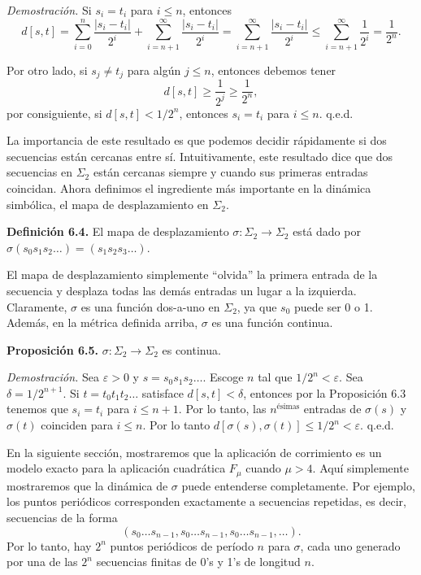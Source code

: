 \documentclass[10pt,a4paper]{book}
\begin{document}
\textit{Demostración.} Si $s_i = t_i$ para $i \leq n$, entonces
\[
d[s,t] = \sum_{i=0}^n \frac{|s_i - t_i|}{2^i} + \sum_{i=n+1}^\infty \frac{|s_i - t_i|}{2^i}
= \sum_{i=n+1}^\infty \frac{|s_i - t_i|}{2^i} \leq \sum_{i=n+1}^\infty \frac{1}{2^i} = \frac{1}{2^n}.
\]

Por otro lado, si $s_j \ne t_j$ para algún $j \leq n$, entonces debemos tener
\[
d[s,t] \geq \frac{1}{2^j} \geq \frac{1}{2^n},
\]
por consiguiente, si $d[s,t] < 1/2^n$, entonces $s_i = t_i$ para $i \leq n$. \hfill q.e.d.

La importancia de este resultado es que podemos decidir rápidamente si dos secuencias están cercanas entre sí. Intuitivamente, este resultado dice que dos secuencias en $\Sigma_2$ están cercanas siempre y cuando sus primeras entradas coincidan. Ahora definimos el ingrediente más importante en la dinámica simbólica, el mapa de desplazamiento en $\Sigma_2$.

\textbf{Definición 6.4.} El mapa de desplazamiento $\sigma : \Sigma_2 \to \Sigma_2$ está dado por $\sigma(s_0 s_1 s_2 \ldots) = (s_1 s_2 s_3 \ldots)$.

El mapa de desplazamiento simplemente “olvida” la primera entrada de la secuencia y desplaza todas las demás entradas un lugar a la izquierda. Claramente, $\sigma$ es una función dos-a-uno en $\Sigma_2$, ya que $s_0$ puede ser 0 o 1. Además, en la métrica definida arriba, $\sigma$ es una función continua.

\textbf{Proposición 6.5.} $\sigma : \Sigma_2 \to \Sigma_2$ es continua.

\textit{Demostración.} Sea $\varepsilon > 0$ y $s = s_0 s_1 s_2 \ldots$. Escoge $n$ tal que $1/2^n < \varepsilon$. Sea $\delta = 1/2^{n+1}$. Si $t = t_0 t_1 t_2 \ldots$ satisface $d[s,t] < \delta$, entonces por la Proposición 6.3 tenemos que $s_i = t_i$ para $i \leq n + 1$. Por lo tanto, las $n^\text{ésimas}$ entradas de $\sigma(s)$ y $\sigma(t)$ coinciden para $i \leq n$. Por lo tanto $d[\sigma(s), \sigma(t)] \leq 1/2^n < \varepsilon$. \hfill q.e.d.

En la siguiente sección, mostraremos que la aplicación de corrimiento es un modelo exacto para la aplicación cuadrática \( F_\mu \) cuando \( \mu > 4 \). Aquí simplemente mostraremos que la dinámica de \( \sigma \) puede entenderse completamente. Por ejemplo, los puntos periódicos corresponden exactamente a secuencias repetidas, es decir, secuencias de la forma 
\[
(s_0 \ldots s_{n-1}, s_0 \ldots s_{n-1}, s_0 \ldots s_{n-1}, \ldots).
\]
Por lo tanto, hay \( 2^n \) puntos periódicos de período \( n \) para \( \sigma \), cada uno generado por una de las \( 2^n \) secuencias finitas de 0's y 1's de longitud \( n \).
\end{document}
